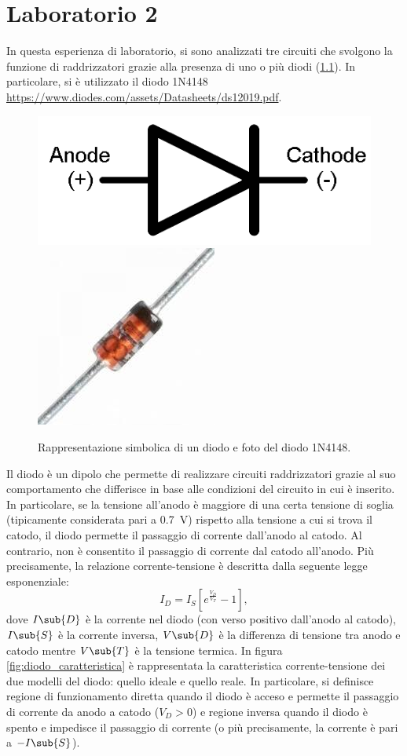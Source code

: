 \chapter{Laboratorio 2}
In questa esperienza di laboratorio, si sono analizzati tre circuiti che svolgono la funzione di raddrizzatori grazie alla presenza di uno o più diodi (\Fig\ref{fig:diodo}). In particolare, si è utilizzato il diodo 1N4148 \url{https://www.diodes.com/assets/Datasheets/ds12019.pdf}.
\begin{figure}[h]
	\centering
	\includegraphics[width=0.25\linewidth]{./ImageFiles/Laboratorio 2/diodo_1}
	\includegraphics[width=0.15\linewidth]{./ImageFiles/Laboratorio 2/diodo_4}
	\caption{Rappresentazione simbolica di un diodo e foto del diodo 1N4148.}
	\label{fig:diodo}
\end{figure}
Il diodo è un dipolo che permette di realizzare circuiti raddrizzatori grazie al suo comportamento che differisce in base alle condizioni del circuito in cui è inserito. In particolare, se la tensione all'anodo è maggiore di una certa tensione di soglia (tipicamente considerata pari a \SI{0.7}{\volt}) rispetto alla tensione a cui si trova il catodo, il diodo permette il passaggio di corrente dall'anodo al catodo. Al contrario, non è consentito il passaggio di corrente dal catodo all'anodo. Più precisamente, la relazione corrente-tensione è descritta dalla seguente legge esponenziale:
\begin{equation}
	I_D=I_S[e^{\frac{V_D}{V_T}}-1],
\end{equation}
dove $I\sub{D}$ è la corrente nel diodo (con verso positivo dall'anodo al catodo), $I\sub{S}$ è la corrente inversa, $V\sub{D}$ è la differenza di tensione tra anodo e catodo mentre $V\sub{T}$ è la tensione termica. In figura \ref{fig:diodo_caratteristica} è rappresentata la caratteristica corrente-tensione dei due modelli del diodo: quello ideale e quello reale. In particolare, si definisce regione di funzionamento diretta quando il diodo è acceso e permette il passaggio di corrente da anodo a catodo ($V_{D}>0$) e regione inversa quando il diodo è spento e impedisce il passaggio di corrente (o più precisamente, la corrente è pari a $-I\sub{S}$).
